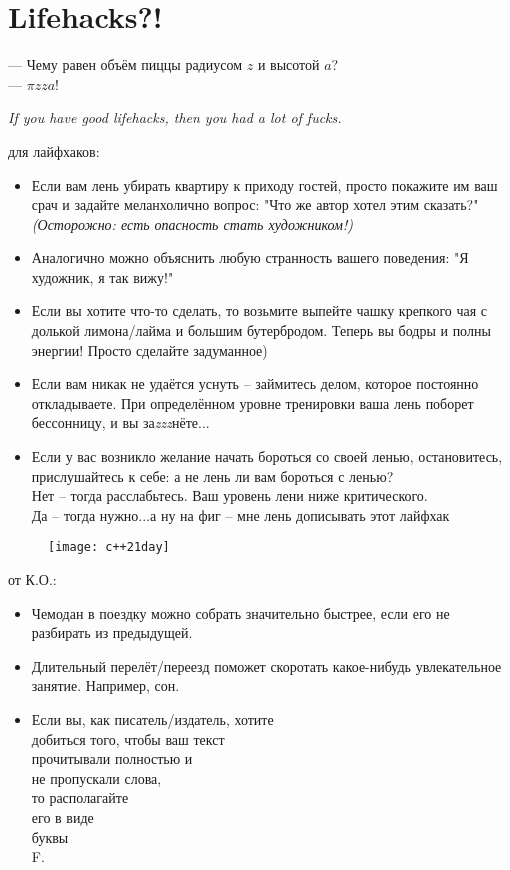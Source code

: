 \section{Lifehacks?!}
\begin{epigraph}
    --- Чему равен объём пиццы радиусом \( z \) и высотой \( a \)?\\
    --- \( \pi z z a \)!
\end{epigraph}

\noindent\emph{If you have good lifehacks, then you had a lot of fucks.}

 для лайфхаков:
\begin{itemize}
    \item Если вам лень убирать квартиру к приходу гостей, просто покажите им ваш срач и задайте меланхолично вопрос: "Что же автор хотел этим сказать?" \emph{(Осторожно: есть опасность стать художником!)}
    \item Аналогично можно объяснить любую странность вашего поведения: "Я художник, я так вижу!"
    \item Если вы хотите что-то сделать, то возьмите выпейте чашку крепкого чая с долькой лимона/лайма и большим бутербродом. Теперь вы бодры и полны энергии! Просто сделайте задуманное)
    \item Если вам никак не удаётся уснуть -- займитесь делом, которое постоянно откладываете. При определённом уровне тренировки ваша лень поборет бессонницу, и вы за\emph{zzz}нёте...
    \item Если у вас возникло желание начать бороться со своей ленью, остановитесь, прислушайтесь к себе: а не лень ли вам бороться с ленью?\\
        Нет -- тогда расслабьтесь. Ваш уровень лени ниже критического.\\
        Да -- тогда нужно...а ну на фиг -- мне лень дописывать этот лайфхак
\end{itemize}

\pagebreak

\begin{figure}[ht!]
    \centering
    \texttt{[image: c++21day]}
\end{figure}

 от К.О.:
\begin{itemize}
    \item Чемодан в поездку можно собрать значительно быстрее, если его не разбирать из предыдущей.
    \item Длительный перелёт/переезд поможет скоротать какое-нибудь увлекательное занятие. Например, сон.
    \item Если вы, как писатель/издатель, хотите \\ добиться того, чтобы ваш текст \\
        прочитывали полностью и \\
        не пропускали слова, \\
        то располагайте \\
        его в виде \\
        буквы \\
        F.
\end{itemize}
